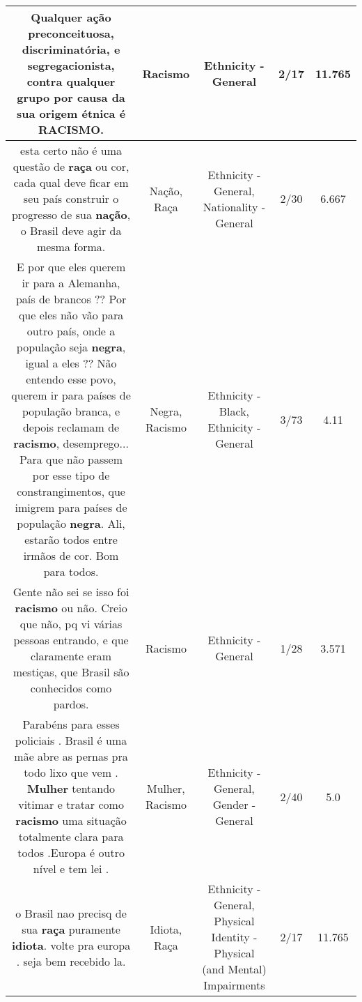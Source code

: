 \documentclass[11pt]{article}
\newlength\mylength
\begin{document}
\begin{center}
\begin{longtable}{|C{.65\mylength}|C{.30\mylength}|C{.12\mylength}|C{.12\mylength}|C{.12\mylength}|}
  \small Qualquer ação preconceituosa, discriminatória, e segregacionista, contra qualquer grupo por causa da sua origem étnica é \textbf{RACISMO}.\normalsize   & Racismo & Ethnicity - General & 2/17 & 11.765 \\  \hline
  \small esta certo não é uma questão de \textbf{raça} ou cor,  cada qual deve ficar em seu país construir o progresso de sua \textbf{nação}, o Brasil deve agir da mesma forma.\normalsize   & Nação, Raça & Ethnicity - General, Nationality - General & 2/30 & 6.667 \\  \hline
  \small E por que eles querem ir para a Alemanha, país de brancos ?? Por que eles não vão para outro país, onde a população seja \textbf{negra}, igual a eles ?? Não entendo esse povo, querem ir para países de população branca, e depois reclamam de \textbf{racismo}, desemprego... Para que não passem por esse tipo de constrangimentos, que imigrem para países de população \textbf{negra}. Ali, estarão todos entre irmãos de cor. Bom para todos.\normalsize   & Negra, Racismo & Ethnicity - Black, Ethnicity - General & 3/73 & 4.11 \\  \hline
  \small Gente não sei se isso foi \textbf{racismo} ou não. Creio que não, pq vi várias pessoas entrando, e que claramente eram mestiças, que Brasil são conhecidos como pardos.\normalsize   & Racismo & Ethnicity - General & 1/28 & 3.571 \\  \hline
  \small Parabéns para esses policiais . Brasil é uma mãe abre as pernas pra todo lixo que vem . \textbf{Mulher} tentando vitimar e tratar como \textbf{racismo} uma situação totalmente clara para todos .Europa é outro nível e tem lei .\normalsize   & Mulher, Racismo & Ethnicity - General, Gender - General & 2/40 & 5.0 \\  \hline
  \small o Brasil nao precisq de sua \textbf{raça} puramente \textbf{idiota}. volte pra europa . seja bem recebido la.\normalsize   & Idiota, Raça & Ethnicity - General, Physical Identity - Physical (and Mental) Impairments & 2/17 & 11.765 \\  \hline

\end{longtable}
\end{center}
\end{document}
